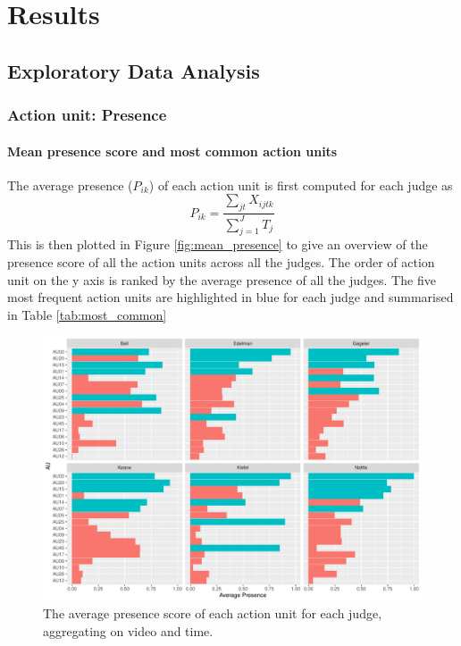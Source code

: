 \documentclass{monashthesis}
\begin{document}
\hypertarget{results}{%
\chapter{Results}\label{results}}

\hypertarget{exploratory-data-analysis}{%
\section{Exploratory Data Analysis}\label{exploratory-data-analysis}}

\hypertarget{action-unit-presence}{%
\subsection{Action unit: Presence}\label{action-unit-presence}}

\hypertarget{mean-presence-score-and-most-common-action-units}{%
\subsubsection{Mean presence score and most common action units}\label{mean-presence-score-and-most-common-action-units}}

The average presence (\(P_{ik}\)) of each action unit is first computed for each judge as \[P_{ik} = \frac{\sum_{jt}X_{ijtk}}{\sum_{j = 1}^JT_j}\] This is then plotted in Figure \ref{fig:mean_presence} to give an overview of the presence score of all the action units across all the judges. The order of action unit on the y axis is ranked by the average presence of all the judges. The five most frequent action units are highlighted in blue for each judge and summarised in Table \ref{tab:most_common}

\begin{figure}

{\centering \includegraphics[width=1\linewidth]{figures/most-common-1} 

}

\caption{The average presence score of each action unit for each judge, aggregating on video and time. \label{fig:mean_presence}}\label{fig:most-common}
\end{figure}
\end{document}
